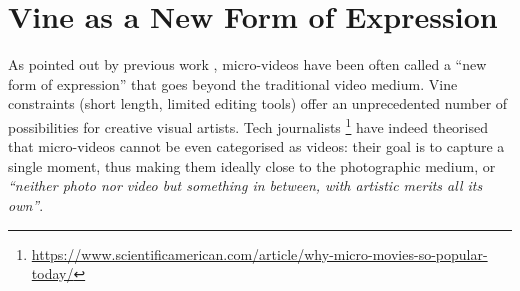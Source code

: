 \section{Vine as a New Form of Expression}
As pointed out  by previous work \cite{redi20146}, micro-videos have been often called a ``new form of expression'' that goes beyond the traditional video medium.  Vine constraints (short length, limited editing tools) offer an unprecedented number of possibilities for creative visual artists. Tech journalists \footnote{\small \url{https://www.scientificamerican.com/article/why-micro-movies-so-popular-today/}} have indeed theorised that micro-videos cannot be even categorised as videos: their goal is to capture a single moment, thus making them ideally close to the photographic medium, or  \emph{``neither photo nor video but something in between, with artistic merits all its own''}. 

